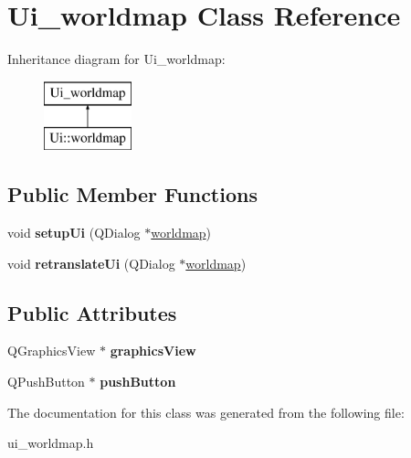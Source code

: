 \hypertarget{class_ui__worldmap}{\section{Ui\-\_\-worldmap Class Reference}
\label{class_ui__worldmap}
}
Inheritance diagram for Ui\-\_\-worldmap\-:\begin{figure}[H]
\begin{center}
\leavevmode
\includegraphics[height=2.000000cm]{class_ui__worldmap}
\end{center}
\end{figure}
\subsection*{Public Member Functions}
\begin{DoxyCompactItemize}
\item 
\hypertarget{class_ui__worldmap_ab7d2484e858585cb624fc3d3f0565c04}{void {\bfseries setup\-Ui} (Q\-Dialog $\ast$\hyperlink{classworldmap}{worldmap})}\label{class_ui__worldmap_ab7d2484e858585cb624fc3d3f0565c04}

\item 
\hypertarget{class_ui__worldmap_ad9a0a2c03f11c614814db6e90484a479}{void {\bfseries retranslate\-Ui} (Q\-Dialog $\ast$\hyperlink{classworldmap}{worldmap})}\label{class_ui__worldmap_ad9a0a2c03f11c614814db6e90484a479}

\end{DoxyCompactItemize}
\subsection*{Public Attributes}
\begin{DoxyCompactItemize}
\item 
\hypertarget{class_ui__worldmap_a2877c0f2062f90387f526cc98f78fadc}{Q\-Graphics\-View $\ast$ {\bfseries graphics\-View}}\label{class_ui__worldmap_a2877c0f2062f90387f526cc98f78fadc}

\item 
\hypertarget{class_ui__worldmap_aa1591d6b2978ebc1b8b1b3f9a89c5fae}{Q\-Push\-Button $\ast$ {\bfseries push\-Button}}\label{class_ui__worldmap_aa1591d6b2978ebc1b8b1b3f9a89c5fae}

\end{DoxyCompactItemize}


The documentation for this class was generated from the following file\-:\begin{DoxyCompactItemize}
\item 
ui\-\_\-worldmap.\-h\end{DoxyCompactItemize}
